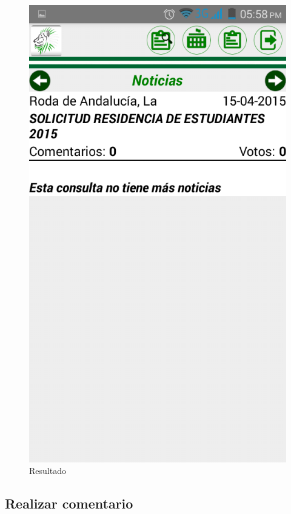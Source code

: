 \begin{figure}
\centering
\includegraphics[scale=0.5]{./android/imagenes/bus3.png}
\caption{Resultado}
\label{bus3}
\end{figure}


\subsection{Realizar comentario}

